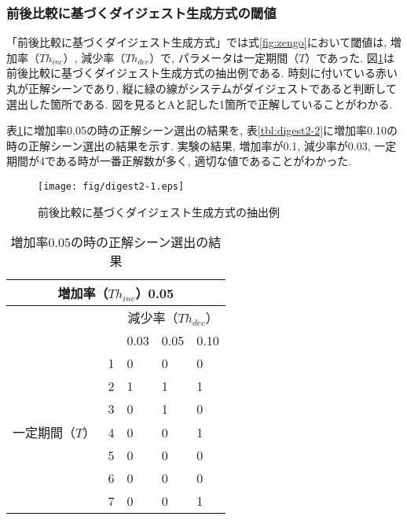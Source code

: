 \newpage

\subsubsection{前後比較に基づくダイジェスト生成方式の閾値}
「前後比較に基づくダイジェスト生成方式」では式\ref{fig:zengo}において閾値は, 増加率（$Th_{inc}$）, 減少率（$Th_{dec}$）で, パラメータは一定期間（$T$）であった. 図\ref{fig:digest2-1}は前後比較に基づくダイジェスト生成方式の抽出例である. 時刻に付いている赤い丸が正解シーンであり, 縦に緑の線がシステムがダイジェストであると判断して選出した箇所である. 図を見るとAと記した1箇所で正解していることがわかる.

表\ref{tbl:digest2-1}に増加率0.05の時の正解シーン選出の結果を, 表\ref{tbl:digest2-2}に増加率0.10の時の正解シーン選出の結果を示す. 実験の結果, 増加率が0.1, 減少率が0.03, 一定期間が4である時が一番正解数が多く, 適切な値であることがわかった.

\begin{figure}[h]
  \centering
  \texttt{[image: fig/digest2-1.eps]}
  \caption{前後比較に基づくダイジェスト生成方式の抽出例}
  \label{fig:digest2-1}
\end{figure}

\begin{table}[h]
  \caption{増加率0.05の時の正解シーン選出の結果}
  \label{tbl:digest2-1}
  \centering
      {\small
        \begin{tabular}{|l|l||l|l|l|} \hline
          \multicolumn{5}{|c|}{増加率（$Th_{inc}$）0.05} \\ \hline
          & & \multicolumn{3}{c|}{減少率（$Th_{dec}$）} \\ \hline
          & & 0.03 & 0.05 & 0.10 \\ \hline \hline \cline{2-5}
          & 1 & 0 & 0 & 0 \\ \cline{2-5}
          & 2 & 1 & 1 & 1 \\ \cline{2-5}
          & 3 & 0 & 1 & 0 \\ \cline{2-5}
          一定期間（$T$）& 4 & 0 & 0 & 1 \\ \cline{2-5}
          & 5 & 0 & 0 & 0 \\ \cline{2-5}
          & 6 & 0 & 0 & 0 \\ \cline{2-5}
          & 7 & 0 & 0 & 1 \\ \cline{2-5}
          \hline
        \end{tabular}
      }
\end{table}

